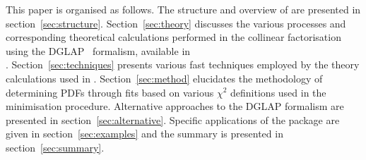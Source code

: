 This paper is organised as follows.
%
The structure and overview of \fitter are presented in section~\ref{sec:structure}.
Section~\ref{sec:theory} discusses the various processes 
and corresponding theoretical calculations performed in the collinear factorisation using the DGLAP~\cite{Gribov:1972ri,Gribov:1972rt,Lipatov:1974qm,
Dokshitzer:1977sg,Altarelli:1977zs} formalism, available in \\ \fitter.
%
Section~\ref{sec:techniques} presents various fast techniques employed by the theory calculations used in \fitter.
Section~\ref{sec:method} elucidates the 
methodology of determining PDFs through fits based on various
 $\chi^2$ definitions used in the
minimisation procedure. 
Alternative approaches to the DGLAP formalism are presented in section~\ref{sec:alternative}.
%
Specific applications of the package are given in
section~\ref{sec:examples} and the summary is presented in section~\ref{sec:summary}.
%

